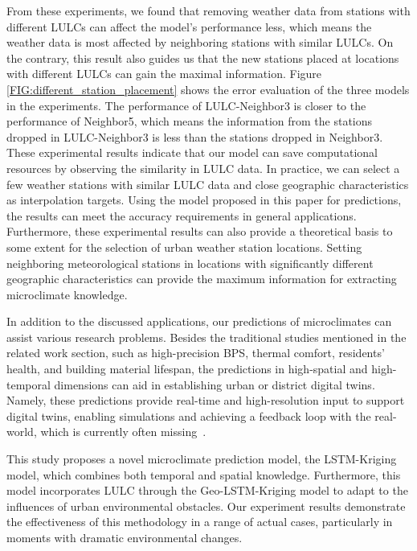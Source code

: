 \documentclass[a4paper,fleqn]{cas-sc}
\begin{document}
From these experiments, we found that removing weather data from stations with different LULCs can affect the model's performance less, which means the weather data is most affected by neighboring stations with similar LULCs. On the contrary, this result also guides us that the new stations placed at locations with different LULCs can gain the maximal information. Figure \ref{FIG:different_station_placement} shows the error evaluation of the three models in the experiments. The performance of LULC-Neighbor3 is closer to the performance of Neighbor5, which means the information from the stations dropped in LULC-Neighbor3 is less than the stations dropped in Neighbor3. These experimental results indicate that our model can save computational resources by observing the similarity in LULC data. In practice, we can select a few weather stations with similar LULC data and close geographic characteristics as interpolation targets. Using the model proposed in this paper for predictions, the results can meet the accuracy requirements in general applications. Furthermore, these experimental results can also provide a theoretical basis to some extent for the selection of urban weather station locations. Setting neighboring meteorological stations in locations with significantly different geographic characteristics can provide the maximum information for extracting microclimate knowledge. 
\fi

In addition to the discussed applications, our predictions of microclimates can assist various research problems. Besides the traditional studies mentioned in the related work section, such as high-precision BPS, thermal comfort, residents' health, and building material lifespan, the predictions in high-spatial and high-temporal dimensions can aid in establishing urban or district digital twins. Namely, these predictions provide real-time and high-resolution input to support digital twins, enabling simulations and achieving a feedback loop with the real-world, which is currently often missing~\citep{2023_autcon_dt_challenges,2023_scs_human_dt}. 


This study proposes a novel microclimate prediction model, the LSTM-Kriging model, which combines both temporal and spatial knowledge. Furthermore, this model incorporates LULC through the Geo-LSTM-Kriging model to adapt to the influences of urban environmental obstacles. Our experiment results demonstrate the effectiveness of this methodology in a range of actual cases, particularly in moments with dramatic environmental changes.
\end{document}
